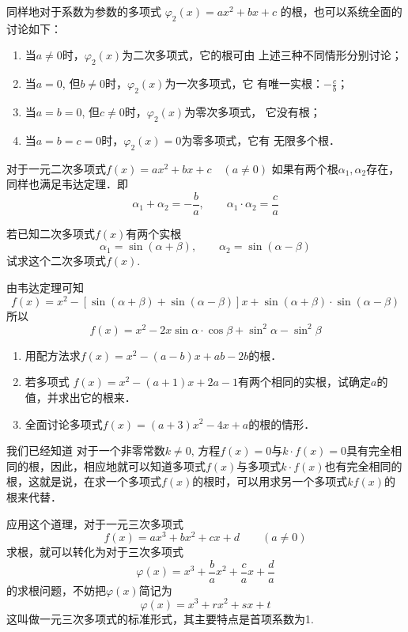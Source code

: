 同样地对于系数为参数的多项式
$\varphi_2 (x) =ax^2+bx+c$
的根，也可以系统全面的讨论如下：

\begin{enumerate}
\item 当$a\ne 0$时，$\varphi_2(x)$为二次多项式，它的根可由
上述三种不同情形分别讨论；
\item 当$a=0$, 但$b\ne 0$时，$\varphi_2(x)$为一次多项式，它
有唯一实根：$-\frac{c}{b}$；
\item 当$a=b=0$, 但$c\ne 0$时，$\varphi_2(x)$为零次多项式，
它没有根；
\item 当$a=b=c=0$时，$\varphi_2(x)=0$为零多项式，它有
无限多个根．
\end{enumerate}

对于一元二次多项式$f (x) =ax^2+bx+c\quad  (a\ne 0)$
如果有两个根$\alpha_1,\alpha_2$存在，同样也满足韦达定理．即
\[\alpha_1+\alpha_2=-\frac{b}{a},\qquad \alpha_1\cdot \alpha_2=\frac{c}{a}\]

\begin{example}
    若已知二次多项式$f(x)$有两个实根
  \[  \alpha_1 =\sin (\alpha+\beta) ,\qquad  \alpha_2=\sin (\alpha-\beta) \]
    试求这个二次多项式$f(x)$.
\end{example}

\begin{solution}
    由韦达定理可知
\[f(x)=x^2-[\sin (\alpha+\beta) +\sin (\alpha-\beta) ]x+\sin (\alpha+\beta) \cdot \sin (\alpha-\beta) \]
所以
\[f(x)=x^2-2x\sin\alpha\cdot \cos\beta+\sin^2\alpha-\sin^2\beta\]
\end{solution}

\begin{ex}
\begin{enumerate}
    \item 用配方法求$f(x)=x^2-(a-b)x+ab-2b$的根．
    \item 若多项式
$f (x) =x^2- (a+1) x+2a-1$有两个相同的实根，试确定$a$的值，并求出它的根来．
\item 全面讨论多项式$f(x)=(a+3)x^2-4x+a$的根的情形．
\end{enumerate}
\end{ex}

我们已经知道
对于一个非零常数$k\ne 0$, 方程$f(x)=0$与$k\cdot f(x)=0$具有完全相同的根，因此，相应地就可以知道多项式$f(x)$与多项式$k\cdot f(x)$也有完全相同的根，这就是说，在求一个多项式$f(x)$的根时，可以用求另一个多项式$kf(x)$的根来代替．

应用这个道理，对于一元三次多项式
\begin{equation}
    f (x) =ax^3+bx^2+cx+d\qquad  (a\ne 0)
\end{equation}
求根，就可以转化为对于三次多项式
\[\varphi(x)=x^3+\frac{b}{a}x^2+\frac{c}{a}x+\frac{d}{a}\]
的求根问题，不妨把$\varphi(x)$简记为
\begin{equation}
    \varphi(x)=x^3+rx^2+sx+t
\end{equation}
这叫做一元三次多项式的标准形式，其主要特点是首项系数为1.

